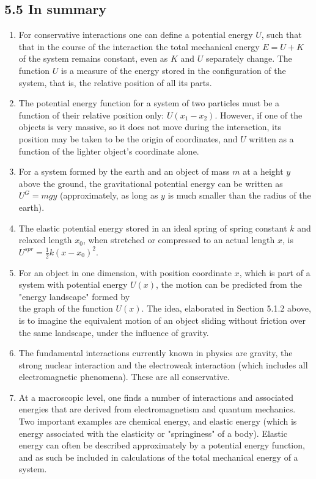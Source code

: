 \documentclass[10pt]{article}
\begin{document}
\subsection*{5.5 In summary}
\begin{enumerate}
  \item For conservative interactions one can define a potential energy $U$, such that that in the course of the interaction the total mechanical energy $E=U+K$ of the system remains constant, even as $K$ and $U$ separately change. The function $U$ is a measure of the energy stored in the configuration of the system, that is, the relative position of all its parts.
  \item The potential energy function for a system of two particles must be a function of their relative position only: $U\left(x_{1}-x_{2}\right)$. However, if one of the objects is very massive, so it does not move during the interaction, its position may be taken to be the origin of coordinates, and $U$ written as a function of the lighter object's coordinate alone.
  \item For a system formed by the earth and an object of mass $m$ at a height $y$ above the ground, the gravitational potential energy can be written as $U^{G}=m g y$ (approximately, as long as $y$ is much smaller than the radius of the earth).
  \item The elastic potential energy stored in an ideal spring of spring constant $k$ and relaxed length $x_{0}$, when stretched or compressed to an actual length $x$, is $U^{s p r}=\frac{1}{2} k\left(x-x_{0}\right)^{2}$.
  \item For an object in one dimension, with position coordinate $x$, which is part of a system with potential energy $U(x)$, the motion can be predicted from the "energy landscape" formed by\\
the graph of the function $U(x)$. The idea, elaborated in Section 5.1.2 above, is to imagine the equivalent motion of an object sliding without friction over the same landscape, under the influence of gravity.
  \item The fundamental interactions currently known in physics are gravity, the strong nuclear interaction and the electroweak interaction (which includes all electromagnetic phenomena). These are all conservative.
  \item At a macroscopic level, one finds a number of interactions and associated energies that are derived from electromagnetism and quantum mechanics. Two important examples are chemical energy, and elastic energy (which is energy associated with the elasticity or "springiness" of a body). Elastic energy can often be described approximately by a potential energy function, and as such be included in calculations of the total mechanical energy of a system.

\end{enumerate}
\end{document}
